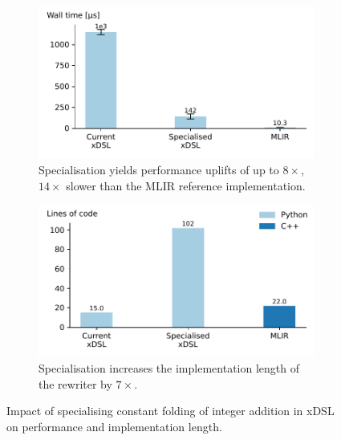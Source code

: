 \begin{figure}[H]
    \centering
    \begin{subfigure}[b]{0.45\textwidth}
        \includegraphics[width=\textwidth]{images/specialising_optimising_xdsl_rewriting/constant_performance.pdf}
        \caption{Specialisation yields performance uplifts of
up to $8\times$, $14\times$ slower than the MLIR reference
implementation.}
        \label{fig:constant-fold-performance}
    \end{subfigure}
    \hfill
    \begin{subfigure}[b]{0.45\textwidth}
        \includegraphics[width=\textwidth]{images/specialising_optimising_xdsl_rewriting/constant_loc.pdf}
        \caption{Specialisation increases the implementation length of the rewriter by $7\times$.} %
        \label{fig:constant-fold-loc}
        \vspace{1em}
    \end{subfigure}
    \caption{Impact of specialising constant folding of integer addition in xDSL on performance and implementation length.}
    \label{fig:constant-fold-summary}
\end{figure}

